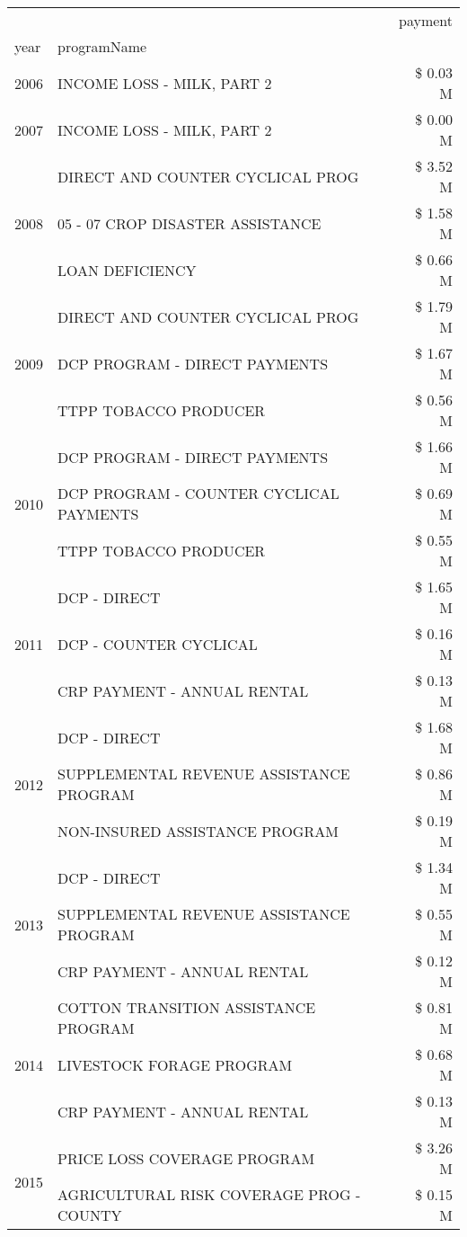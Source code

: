 \begin{tabular}{llr}
\toprule
 &  & payment \\
year & programName &  \\
\midrule
2006 & INCOME LOSS - MILK, PART 2 & \$ 0.03 M \\
\cline{1-3}
2007 & INCOME LOSS - MILK, PART 2 & \$ 0.00 M \\
\cline{1-3}
\multirow[t]{3}{*}{2008} & DIRECT AND COUNTER CYCLICAL PROG & \$ 3.52 M \\
 & 05 - 07 CROP DISASTER ASSISTANCE & \$ 1.58 M \\
 & LOAN DEFICIENCY & \$ 0.66 M \\
\cline{1-3}
\multirow[t]{3}{*}{2009} & DIRECT AND COUNTER CYCLICAL PROG & \$ 1.79 M \\
 & DCP PROGRAM - DIRECT PAYMENTS & \$ 1.67 M \\
 & TTPP TOBACCO PRODUCER & \$ 0.56 M \\
\cline{1-3}
\multirow[t]{3}{*}{2010} & DCP PROGRAM - DIRECT PAYMENTS & \$ 1.66 M \\
 & DCP PROGRAM - COUNTER CYCLICAL PAYMENTS & \$ 0.69 M \\
 & TTPP TOBACCO PRODUCER & \$ 0.55 M \\
\cline{1-3}
\multirow[t]{3}{*}{2011} & DCP - DIRECT & \$ 1.65 M \\
 & DCP - COUNTER CYCLICAL & \$ 0.16 M \\
 & CRP PAYMENT - ANNUAL RENTAL & \$ 0.13 M \\
\cline{1-3}
\multirow[t]{3}{*}{2012} & DCP - DIRECT & \$ 1.68 M \\
 & SUPPLEMENTAL REVENUE ASSISTANCE PROGRAM & \$ 0.86 M \\
 & NON-INSURED ASSISTANCE PROGRAM & \$ 0.19 M \\
\cline{1-3}
\multirow[t]{3}{*}{2013} & DCP - DIRECT & \$ 1.34 M \\
 & SUPPLEMENTAL REVENUE ASSISTANCE PROGRAM & \$ 0.55 M \\
 & CRP PAYMENT - ANNUAL RENTAL & \$ 0.12 M \\
\cline{1-3}
\multirow[t]{3}{*}{2014} & COTTON TRANSITION ASSISTANCE PROGRAM & \$ 0.81 M \\
 & LIVESTOCK FORAGE PROGRAM & \$ 0.68 M \\
 & CRP PAYMENT - ANNUAL RENTAL & \$ 0.13 M \\
\cline{1-3}
\multirow[t]{3}{*}{2015} & PRICE LOSS COVERAGE PROGRAM & \$ 3.26 M \\
 & AGRICULTURAL RISK COVERAGE PROG - COUNTY & \$ 0.15 M \\

\end{tabular}
